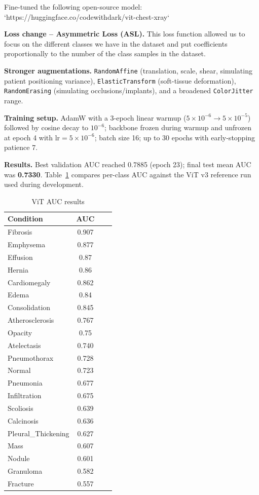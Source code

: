 \documentclass[11pt]{article}
\begin{document}
Fine-tuned the following open-source model: `https://huggingface.co/codewithdark/vit-chest-xray`


\textbf{Loss change -- Asymmetric Loss (ASL).} This loss function allowed us to focus on the different classes we have in the dataset and put coefficients proportionally to the number of the class samples in the dataset.

\textbf{Stronger augmentations.} \texttt{RandomAffine} (translation, scale, shear,
simulating patient positioning variance), \texttt{ElasticTransform} (soft-tissue
deformation), \texttt{RandomErasing} (simulating occlusions/implants), and a
broadened \texttt{ColorJitter} range.

\textbf{Training setup.} AdamW with a 3-epoch linear warmup ($5\times10^{-6} \to
5\times10^{-5}$) followed by cosine decay to $10^{-6}$; backbone frozen during
warmup and unfrozen at epoch 4 with $\text{lr}=5\times10^{-6}$; batch size 16; up
to 30 epochs with early-stopping patience 7.

\textbf{Results.} Best validation AUC reached 0.7885 (epoch 23); final test mean
AUC was \textbf{0.7330}. Table~\ref{tab:vit-v4} compares per-class AUC against the
ViT v3 reference run used during development.

\begin{table}[H]
\centering
\caption{ViT AUC results}
\label{tab:vit-v4}
\begin{tabular}{lccc}
\toprule
Condition & AUC  \\
\midrule
Fibrosis            & 0.907 \\
Emphysema           & 0.877 \\
Effusion            & 0.87 \\
Hernia              & 0.86 \\
Cardiomegaly        & 0.862 \\
Edema               & 0.84 \\
Consolidation       & 0.845 \\
Atherosclerosis     & 0.767 \\
Opacity             & 0.75 \\
Atelectasis         & 0.740 \\
Pneumothorax        & 0.728 \\
Normal              & 0.723  \\
Pneumonia           & 0.677  \\
Infiltration        & 0.675  \\
Scoliosis           & 0.639  \\
Calcinosis          & 0.636  \\
Pleural\_Thickening & 0.627  \\
Mass                & 0.607  \\
Nodule              & 0.601  \\
Granuloma           & 0.582  \\
Fracture            & 0.557  \\
\bottomrule
\end{tabular}
\end{table}
\end{document}
